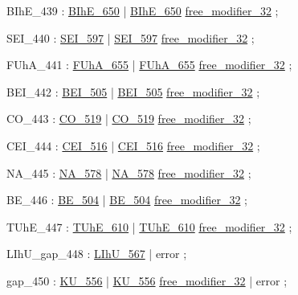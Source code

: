\label{html:y439}
BIhE_439                :  \hyperref[html:y650]{BIhE_650}
                        |  \hyperref[html:y650]{BIhE_650}  \hyperref[html:y32]{free_modifier_32}
                        ;

\label{html:y440}
SEI_440                 :  \hyperref[html:y597]{SEI_597}
                        |  \hyperref[html:y597]{SEI_597}  \hyperref[html:y32]{free_modifier_32}
                        ;

\label{html:y441}
FUhA_441                :  \hyperref[html:y655]{FUhA_655}
                        |  \hyperref[html:y655]{FUhA_655}  \hyperref[html:y32]{free_modifier_32}
                        ;

\label{html:y442}
BEI_442                 :  \hyperref[html:y505]{BEI_505}
                        |  \hyperref[html:y505]{BEI_505}  \hyperref[html:y32]{free_modifier_32}
                        ;

\label{html:y443}
CO_443                  :  \hyperref[html:y519]{CO_519}
                        |  \hyperref[html:y519]{CO_519}  \hyperref[html:y32]{free_modifier_32}
                        ;

\label{html:y444}
CEI_444                 :  \hyperref[html:y516]{CEI_516}
                        |  \hyperref[html:y516]{CEI_516}  \hyperref[html:y32]{free_modifier_32}
                        ;

\label{html:y445}
NA_445                  :  \hyperref[html:y578]{NA_578}
                        |  \hyperref[html:y578]{NA_578}  \hyperref[html:y32]{free_modifier_32}
                        ;

\label{html:y446}
BE_446                  :  \hyperref[html:y504]{BE_504}
                        |  \hyperref[html:y504]{BE_504}  \hyperref[html:y32]{free_modifier_32}
                        ;

\label{html:y447}
TUhE_447                :  \hyperref[html:y610]{TUhE_610}
                        |  \hyperref[html:y610]{TUhE_610}  \hyperref[html:y32]{free_modifier_32}
                        ;

\label{html:y448}
LIhU_gap_448            :  \hyperref[html:y567]{LIhU_567}
                        |  error
                        ;

\label{html:y450}
gap_450                 :  \hyperref[html:y556]{KU_556}
                        |  \hyperref[html:y556]{KU_556}  \hyperref[html:y32]{free_modifier_32}
                        |  error
                        ;

